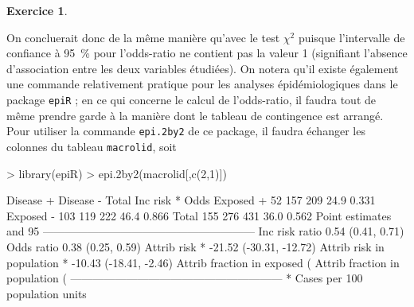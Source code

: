 \documentclass[11pt]{report}
\theoremstyle{definition}
\newtheorem{exo}{Exercice}[chapter]
\begin{document}
\begin{exo}
\begin{sol}
On concluerait donc de la même manière qu'avec le test $\chi^2$ puisque
l'intervalle de confiance à 95~\% pour l'odds-ratio ne contient pas la
valeur 1 (signifiant l'absence d'association entre les deux variables
étudiées). On notera qu'il existe également une commande relativement
pratique pour les analyses épidémiologiques dans le package \texttt{epiR} ;
en ce qui concerne le calcul de l'odds-ratio, il faudra tout de même prendre
garde à la manière dont le tableau de contingence est arrangé. Pour utiliser
la commande \texttt{epi.2by2} de ce package, il faudra échanger les colonnes
du tableau \texttt{macrolid}, soit
\begin{Schunk}
\begin{Sinput}
> library(epiR)
> epi.2by2(macrolid[,c(2,1)])
\end{Sinput}
\begin{Soutput}
             Disease +    Disease -      Total        Inc risk *        Odds
Exposed +           52          157        209              24.9       0.331
Exposed -          103          119        222              46.4       0.866
Total              155          276        431              36.0       0.562
Point estimates and 95 % CIs:
---------------------------------------------------------
Inc risk ratio                         0.54 (0.41, 0.71)
Odds ratio                             0.38 (0.25, 0.59)
Attrib risk *                          -21.52 (-30.31, -12.72)
Attrib risk in population *            -10.43 (-18.41, -2.46)
Attrib fraction in exposed (%)         -86.48 (-145.44, -41.68)
Attrib fraction in population (%)      -29.01 (-42.07, -17.16)
---------------------------------------------------------
 * Cases per 100 population units 
\end{Soutput}
\end{Schunk}


\end{sol}
\end{exo}
\end{document}
